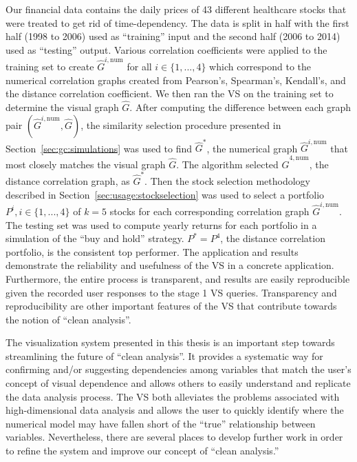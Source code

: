 Our financial data contains the daily prices of 43 different healthcare 
stocks that were treated to get rid of time-dependency. The data is split in 
half with the first half (1998 to 2006) used as ``training'' input and the 
second half (2006 to 2014) used as ``testing'' output. Various correlation 
coefficients were applied to the training set to create 
$\hat{G}^{i,\text{num}}$ for all $i \in \{1,...,4\}$ which correspond to the 
numerical correlation graphs created from Pearson's, Spearman's, Kendall's, and 
the distance correlation coefficient. We 
then ran the VS on the training set to determine the visual graph $\hat{G}$. 
After computing the difference between each graph pair 
$(\hat{G}^{i,\text{num}},\hat{G})$, the similarity selection procedure 
presented in Section~\ref{sec:gc:simulations} was used to find $\hat{G}^*$, the 
numerical graph $\hat{G}^{i,\text{num}}$ that most closely matches the visual 
graph $\hat{G}$. The algorithm selected $\hat{G}^{4,\text{num}}$, the distance 
correlation graph, as $\hat{G}^*$. 
Then the stock selection methodology described in 
Section~\ref{sec:usage:stockselection} was used to select a portfolio $P^i, i 
\in \{1,...,4\}$ of $k = 5$ stocks for each corresponding correlation graph 
$\hat{G}^{i,\text{num}}$. 
The testing set was used to compute yearly returns for each portfolio in a 
simulation of the ``buy and hold'' strategy. $P^* = P^4$, the 
distance correlation portfolio, is the consistent top performer. The 
application and results demonstrate the reliability and usefulness of the VS in 
a concrete application. Furthermore, the entire process is transparent, and 
results are easily reproducible given the recorded user responses 
to the stage 1 VS queries. Transparency and reproducibility are 
other important features of the VS that contribute towards the notion of 
``clean analysis''.

The visualization system presented in this thesis is an important step towards
streamlining the future of ``clean analysis''. It provides a systematic way for 
confirming and/or suggesting dependencies among variables that match the user's 
concept of visual dependence and allows others to easily understand and 
replicate the data analysis process. The VS both 
alleviates the problems associated with high-dimensional data analysis and 
allows the user to quickly identify where the numerical model may have fallen 
short of the ``true'' relationship between variables. Nevertheless, there are 
several places to develop further work in order to refine the system and 
improve our concept of ``clean analysis.''